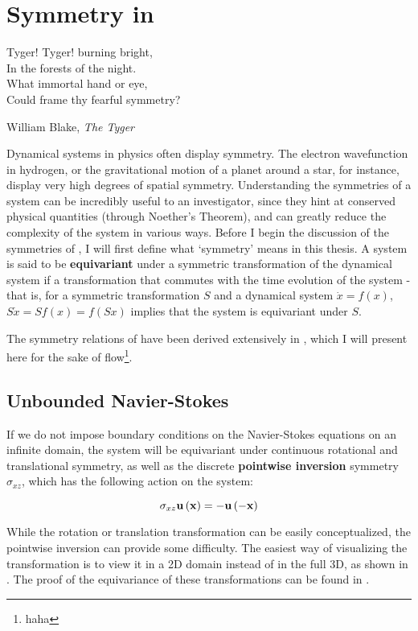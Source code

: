 \chapter{Symmetry in \pCf}	
\epigraph{Tyger! Tyger! burning bright, \\
		In the forests of the night. \\
		What immortal hand or eye,\\
		Could frame thy fearful symmetry?}{William Blake, \emph{The Tyger}} 
Dynamical systems in physics often display symmetry. The electron wavefunction in hydrogen, or the gravitational motion of a planet around a star, for instance, display very high degrees of spatial symmetry.  Understanding the symmetries of a system can be incredibly useful to an investigator, since they hint at conserved physical quantities (through Noether's Theorem), and can greatly reduce the complexity of the system in various ways. Before I begin the discussion of the symmetries of \pCf, I will first define what `symmetry' means in this thesis. A system is said to be {\bf equivariant} under a symmetric transformation of the dynamical system if a transformation that commutes with the time evolution of the system - that is, for a symmetric transformation $S$ and a dynamical system $\dot{x} = f(x)$, $S \dot{x} = Sf(x) = f(Sx)$ implies that the system is equivariant under $S$. 

The symmetry relations of \pCf have been derived extensively in \cite{GIBSON2009}, which I will present here for the sake of flow\footnote{haha}. 
\section{Unbounded Navier-Stokes}

If we do not impose boundary conditions on the Navier-Stokes equations on an infinite domain, the system will be equivariant under continuous rotational and translational symmetry, as well as the discrete {\bf pointwise inversion} symmetry$\sigma_{xz}$, which has the following action on the system:

\begin{equation}\label{eq:pointwiseinversion}
\sigma_{xz}\mathbf{u}\left ( \mathbf{x} \right ) = -\mathbf{u}\left ( -\mathbf{x} \right )
\end{equation}

While the rotation or translation transformation can be easily conceptualized, the pointwise inversion can provide some difficulty. The easiest way of visualizing the transformation is to view it in a 2D domain instead of in the full 3D, as shown in . The proof of the equivariance of these transformations can be found in \cite{a}.



